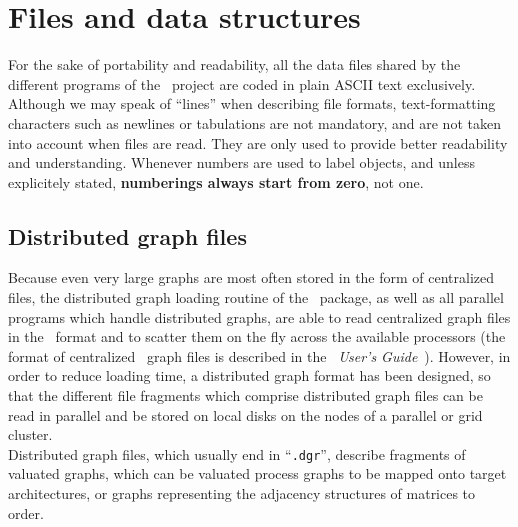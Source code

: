 
\section{Files and data structures}
\label{sec-file}

For the sake of portability and readability, all the data files shared
by the different programs of the \scotch\ project are coded in plain
ASCII text exclusively.  Although we may speak of ``lines'' when
describing file formats, text-formatting characters such as newlines
or tabulations are not mandatory, and are not taken into account when
files are read.  They are only used to provide better readability and
understanding.  Whenever numbers are used to label objects, and unless
explicitely stated, {\bf numberings always start from zero}, not one.

\subsection{Distributed graph files}
\label{sec-file-dsgraph}

Because even very large graphs are most often stored in the form of
centralized files, the distributed graph loading routine of the
\ptscotch\ package, as well as all parallel programs which handle
distributed graphs, are able to read centralized graph files in the
\scotch\ format and to scatter them on the fly across the available
processors (the format of centralized \scotch\ graph files is
described in the {\it\scotch\ User's Guide}~\scotchcitesuser).
However, in order to reduce loading time, a distributed graph format
has been designed, so that the different file fragments which comprise
distributed graph files can be read in parallel and be stored on
local disks on the nodes of a parallel or grid cluster.
\\

Distributed graph files, which usually end in ``{\tt \@.dgr}'',
describe fragments of valuated graphs, which can be valuated process
graphs to be mapped onto target architectures, or graphs representing
the adjacency structures of matrices to order.

